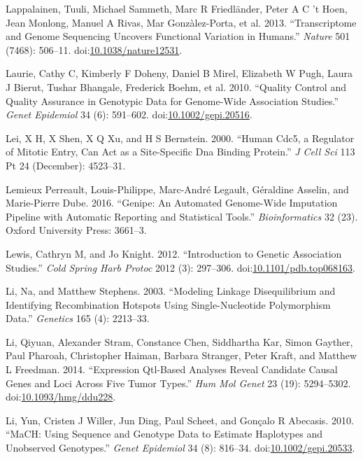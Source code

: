 \documentclass[]{DissertateOSU}
\begin{document}
\hypertarget{ref-Lappalainen_2013}{}
Lappalainen, Tuuli, Michael Sammeth, Marc R Friedländer, Peter A C 't
Hoen, Jean Monlong, Manuel A Rivas, Mar Gonzàlez-Porta, et al. 2013.
``Transcriptome and Genome Sequencing Uncovers Functional Variation in
Humans.'' \emph{Nature} 501 (7468): 506--11.
doi:\href{https://doi.org/10.1038/nature12531}{10.1038/nature12531}.

\hypertarget{ref-laurie2010}{}
Laurie, Cathy C, Kimberly F Doheny, Daniel B Mirel, Elizabeth W Pugh,
Laura J Bierut, Tushar Bhangale, Frederick Boehm, et al. 2010. ``Quality
Control and Quality Assurance in Genotypic Data for Genome-Wide
Association Studies.'' \emph{Genet Epidemiol} 34 (6): 591--602.
doi:\href{https://doi.org/10.1002/gepi.20516}{10.1002/gepi.20516}.

\hypertarget{ref-Lei_2000}{}
Lei, X H, X Shen, X Q Xu, and H S Bernstein. 2000. ``Human Cdc5, a
Regulator of Mitotic Entry, Can Act as a Site-Specific Dna Binding
Protein.'' \emph{J Cell Sci} 113 Pt 24 (December): 4523--31.

\hypertarget{ref-genipe}{}
Lemieux Perreault, Louis-Philippe, Marc-André Legault, Géraldine
Asselin, and Marie-Pierre Dube. 2016. ``Genipe: An Automated Genome-Wide
Imputation Pipeline with Automatic Reporting and Statistical Tools.''
\emph{Bioinformatics} 32 (23). Oxford University Press: 3661--3.

\hypertarget{ref-Lewis_2012}{}
Lewis, Cathryn M, and Jo Knight. 2012. ``Introduction to Genetic
Association Studies.'' \emph{Cold Spring Harb Protoc} 2012 (3):
297--306.
doi:\href{https://doi.org/10.1101/pdb.top068163}{10.1101/pdb.top068163}.

\hypertarget{ref-li_2003}{}
Li, Na, and Matthew Stephens. 2003. ``Modeling Linkage Disequilibrium
and Identifying Recombination Hotspots Using Single-Nucleotide
Polymorphism Data.'' \emph{Genetics} 165 (4): 2213--33.

\hypertarget{ref-li_2014}{}
Li, Qiyuan, Alexander Stram, Constance Chen, Siddhartha Kar, Simon
Gayther, Paul Pharoah, Christopher Haiman, Barbara Stranger, Peter
Kraft, and Matthew L Freedman. 2014. ``Expression Qtl-Based Analyses
Reveal Candidate Causal Genes and Loci Across Five Tumor Types.''
\emph{Hum Mol Genet} 23 (19): 5294--5302.
doi:\href{https://doi.org/10.1093/hmg/ddu228}{10.1093/hmg/ddu228}.

\hypertarget{ref-mach_2010}{}
Li, Yun, Cristen J Willer, Jun Ding, Paul Scheet, and Gonçalo R
Abecasis. 2010. ``MaCH: Using Sequence and Genotype Data to Estimate
Haplotypes and Unobserved Genotypes.'' \emph{Genet Epidemiol} 34 (8):
816--34.
doi:\href{https://doi.org/10.1002/gepi.20533}{10.1002/gepi.20533}.
\end{document}
